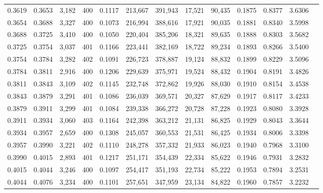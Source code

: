 \begin{tabular}{rrrrrrrrrrrrr}
0.3619 & 0.3653 & 3,182 & 400 &                                     0.1117 & 213,667 & 391,943 &  17,521 &  90,435 & 0.1875 & 0.8377 & 3.6306 \\
0.3654 & 0.3688 & 3,327 & 400 &                                     0.1073 & 216,994 & 388,616 &  17,921 &  90,035 & 0.1881 & 0.8340 & 3.5998 \\
0.3688 & 0.3725 & 3,410 & 400 &                                     0.1050 & 220,404 & 385,206 &  18,321 &  89,635 & 0.1888 & 0.8303 & 3.5682 \\
0.3725 & 0.3754 & 3,037 & 401 &                                     0.1166 & 223,441 & 382,169 &  18,722 &  89,234 & 0.1893 & 0.8266 & 3.5400 \\
0.3754 & 0.3784 & 3,282 & 402 &                                     0.1091 & 226,723 & 378,887 &  19,124 &  88,832 & 0.1899 & 0.8229 & 3.5096 \\
0.3784 & 0.3811 & 2,916 & 400 &                                     0.1206 & 229,639 & 375,971 &  19,524 &  88,432 & 0.1904 & 0.8191 & 3.4826 \\
0.3811 & 0.3843 & 3,109 & 402 &                                     0.1145 & 232,748 & 372,862 &  19,926 &  88,030 & 0.1910 & 0.8154 & 3.4538 \\
0.3843 & 0.3879 & 3,291 & 401 &                                     0.1086 & 236,039 & 369,571 &  20,327 &  87,629 & 0.1917 & 0.8117 & 3.4233 \\
0.3879 & 0.3911 & 3,299 & 401 &                                     0.1084 & 239,338 & 366,272 &  20,728 &  87,228 & 0.1923 & 0.8080 & 3.3928 \\
0.3911 & 0.3934 & 3,060 & 403 &                                     0.1164 & 242,398 & 363,212 &  21,131 &  86,825 & 0.1929 & 0.8043 & 3.3644 \\
0.3934 & 0.3957 & 2,659 & 400 &                                     0.1308 & 245,057 & 360,553 &  21,531 &  86,425 & 0.1934 & 0.8006 & 3.3398 \\
0.3957 & 0.3990 & 3,221 & 402 &                                     0.1110 & 248,278 & 357,332 &  21,933 &  86,023 & 0.1940 & 0.7968 & 3.3100 \\
0.3990 & 0.4015 & 2,893 & 401 &                                     0.1217 & 251,171 & 354,439 &  22,334 &  85,622 & 0.1946 & 0.7931 & 3.2832 \\
0.4015 & 0.4044 & 3,246 & 400 &                                     0.1097 & 254,417 & 351,193 &  22,734 &  85,222 & 0.1953 & 0.7894 & 3.2531 \\
0.4044 & 0.4076 & 3,234 & 400 &                                     0.1101 & 257,651 & 347,959 &  23,134 &  84,822 & 0.1960 & 0.7857 & 3.2232 \\

\end{tabular}
